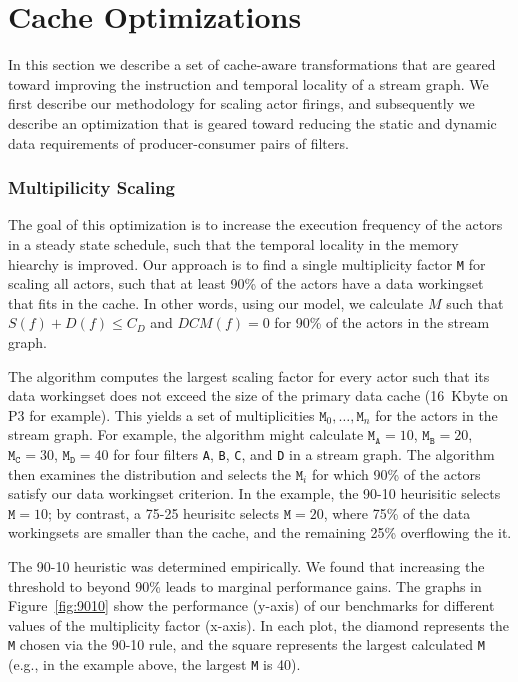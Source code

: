 \section{Cache Optimizations}
\label{sec:cache-opt}

In this section we describe a set of cache-aware transformations that
are geared toward improving the instruction and temporal locality of a
stream graph. We first describe our methodology for scaling actor
firings, and subsequently we describe an optimization that is geared
toward reducing the static and dynamic data requirements of
producer-consumer pairs of filters.



\subsubsection{Multipilicity Scaling}

The goal of this optimization is to increase the execution frequency
of the actors in a steady state schedule, such that the temporal
locality in the memory hiearchy is improved. Our approach is to find a
single multiplicity factor \texttt{M} for scaling all actors, such that
at least 90\% of the actors have a data workingset that fits in the cache.
In other words, using our model, we calculate $M$ such that 
$S(f) + D(f) \leq C_D$ and $DCM(f) = 0$ for 90\% of the actors in the
stream graph.

The algorithm 
computes the largest scaling factor for every actor such that its data
workingset does not exceed the size of the primary data cache
(16~Kbyte on P3 for example). This yields a set of multiplicities
${\texttt{M}_0, \ldots, \texttt{M}_n}$ for the actors in the stream
graph. For example, the algorithm might calculate
$\texttt{M}_\texttt{A} = 10$,
$\texttt{M}_\texttt{B} = 20$, 
$\texttt{M}_\texttt{C} = 30$, 
$\texttt{M}_\texttt{D} = 40$ for four filters \texttt{A}, \texttt{B},
\texttt{C}, and \texttt{D} in a stream graph.
The algorithm then examines the
distribution and selects the $\texttt{M}_i$
for which 90\% of the actors satisfy our data workingset criterion.
In the example, the 90-10 heurisitic
selects $\texttt{M} = 10$; by contrast,
a 75-25 heurisitc selects $\texttt{M} = 20$, where 75\% of the
data workingsets are smaller than the cache, and the remaining 25\%
overflowing the it.

The 90-10 heuristic was determined empirically. We found that
increasing the threshold to beyond 90\% leads to marginal
performance gains. The graphs in Figure~\ref{fig:9010} show the
performance (y-axis) of our benchmarks for different values of the multiplicity
factor (x-axis). In each plot, the diamond represents the \texttt{M} chosen via
the 90-10 rule, and the square represents the largest calculated
\texttt{M} (e.g., in the example above, the largest \texttt{M} is 40).

